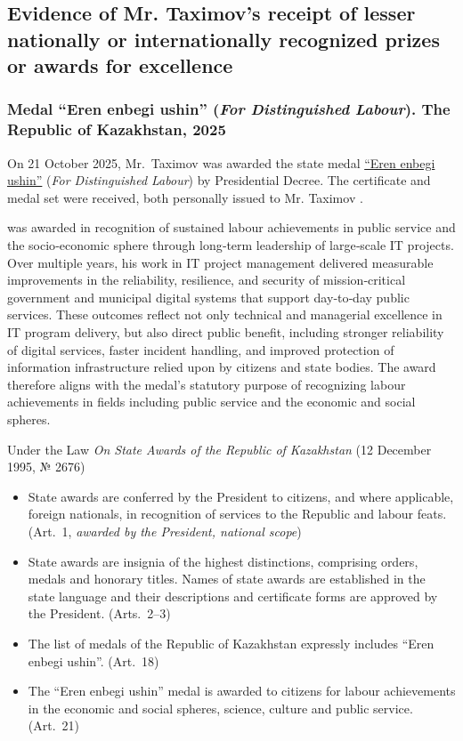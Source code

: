 \subsection{Evidence of Mr. Taximov's receipt of lesser nationally or internationally recognized prizes or awards for excellence}
\label{subsec:Awards}

\subsubsection{Medal ``Eren enbegi ushin'' (\emph{For Distinguished Labour}). The Republic of Kazakhstan, 2025}
\label{subsubsec:ErenEnbegi2025}

On 21 October 2025, Mr.~Taximov was awarded the state medal \underline{``Eren enbegi ushin''} (\emph{For Distinguished Labour}) by Presidential Decree. The certificate and medal set were received, both personally issued to Mr. Taximov .

\mrl was awarded in recognition of sustained labour achievements in public service and the socio‑economic sphere through long‑term leadership of large‑scale IT projects. Over multiple years, his work in IT project management delivered measurable improvements in the reliability, resilience, and security of mission‑critical government and municipal digital systems that support day‑to‑day public services. These outcomes reflect not only technical and managerial excellence in IT program delivery, but also direct public benefit, including stronger reliability of digital services, faster incident handling, and improved protection of information infrastructure relied upon by citizens and state bodies. The award therefore aligns with the medal’s statutory purpose of recognizing labour achievements in fields including public service and the economic and social spheres.

Under the Law \emph{On State Awards of the Republic of Kazakhstan} (12 December 1995, № 2676)

\vspace{-0.5\baselineskip}
\begin{itemize}[nosep]
\item State awards are conferred by the President to citizens, and where applicable, foreign nationals, in recognition of services to the Republic and labour feats. (Art.~1, \emph{awarded by the President, national scope})
\item State awards are insignia of the highest distinctions, comprising orders, medals and honorary titles. Names of state awards are established in the state language and their descriptions and certificate forms are approved by the President. (Arts.~2--3)
\item The list of medals of the Republic of Kazakhstan expressly includes ``Eren enbegi ushin''. (Art.~18)
\item The ``Eren enbegi ushin'' medal is awarded to citizens for labour achievements in the economic and social spheres, science, culture and public service. (Art.~21)
\end{itemize}


